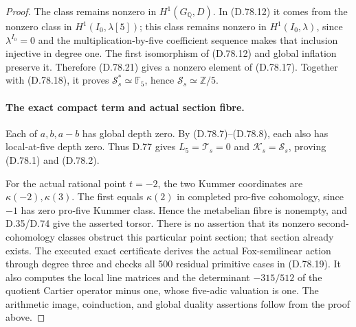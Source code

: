 \begin{proof}
The class remains nonzero in \(H^1(G_{\mathbb Q},D)\).
In (D.78.12) it comes from the nonzero class in
\(H^1(I_0,\lambda[5])\); this class remains nonzero in
\(H^1(I_0,\lambda)\), since \(\lambda^{I_0}=0\) and
the multiplication-by-five coefficient sequence makes
that inclusion injective in degree one. The first
isomorphism of (D.78.12) and global inflation preserve
it. Therefore (D.78.21) gives a nonzero element of
(D.78.17). Together with (D.78.18), it proves
\(\mathcal S_s^*\simeq\mathbb F_5\), hence
\(\mathcal S_s\simeq\mathbb Z/5\).

\paragraph{The exact compact term and actual section fibre.}
Each of \(a,b,a-b\) has global depth zero. By
(D.78.7)--(D.78.8), each also has local-at-five
depth zero. Thus D.77 gives \(L_5=\mathcal T_s=0\)
and \(\mathcal K_s=\mathcal S_s\), proving (D.78.1)
and (D.78.2).

For the actual rational point \(t=-2\), the two
Kummer coordinates are \(\kappa(-2),\kappa(3)\).
The first equals \(\kappa(2)\) in completed pro-five
cohomology, since \(-1\) has zero pro-five Kummer class.
Hence the metabelian fibre is nonempty, and D.35/D.74
give the asserted torsor. There is no assertion that
its nonzero second-cohomology classes obstruct this
particular point section; that section already exists.
The executed exact certificate 
derives the actual Fox-semilinear action through degree three
and checks all 500 residual primitive cases in (D.78.19).
It also computes the local line matrices and the determinant
\(-315/512\) of the quotient Cartier operator minus one,
whose five-adic valuation is one. The arithmetic image,
coinduction, and global duality assertions follow from the
proof above.
\end{proof}
